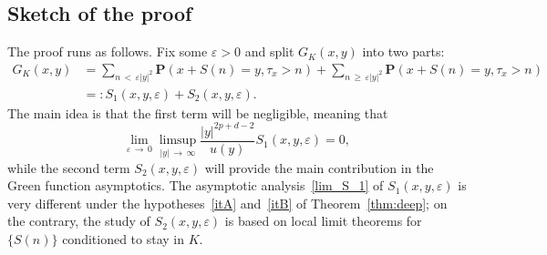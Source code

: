 \documentclass[10pt]{amsart}
\theoremstyle{definition}\newtheorem{defi}[theo]{Definition}\newtheorem{rema}[theo]{Remark}\newtheorem{exam}[theo]{Example}\newtheorem{exem}[theo]{Example}\newtheorem{nota}[theo]{Notation}
\newcommand{\pr}{\mathbf{P}}
\renewcommand{\ge}{\geqslant}
\begin{document}
\subsection*{Sketch of the proof}
The proof runs as follows. Fix some $\varepsilon>0$ and split $G_K(x,y)$ into two parts:
\begin{equation}\label{definition_S1_S2}
\begin{split}
G_K(x,y)&=\sum_{n\,<\,\varepsilon| y|^2}\pr\left(x+S(n)=y,\tau_x>n\right) +\sum_{n\,\ge\,\varepsilon | y|^2}\pr\left(x+S(n)=y,\tau_x>n\right)\\
&=:S_1(x,y,\varepsilon)+S_2(x,y,\varepsilon).
\end{split}
\end{equation}
The main idea is that the first term will be negligible, meaning that
\begin{equation}\label{lim_S_1}
\lim_{\varepsilon\,\to\,0}\limsup_{| y|\,\to\,\infty}\frac{| y|^{2p+d-2}}{u(y)}S_1(x,y,\varepsilon)=0,
\end{equation}
while the second term $S_2(x,y,\varepsilon)$ will provide the main contribution in the Green function asymptotics. The asymptotic analysis~\eqref{lim_S_1} of $S_1(x,y,\varepsilon)$ is very different under the hypotheses~\eqref{itA} and~\eqref{itB} of Theorem~\ref{thm:deep}; on the contrary, the study of $S_2(x,y,\varepsilon)$ is based on local limit theorems for $\{S(n)\}$ conditioned to stay in $K$.
\end{document}
